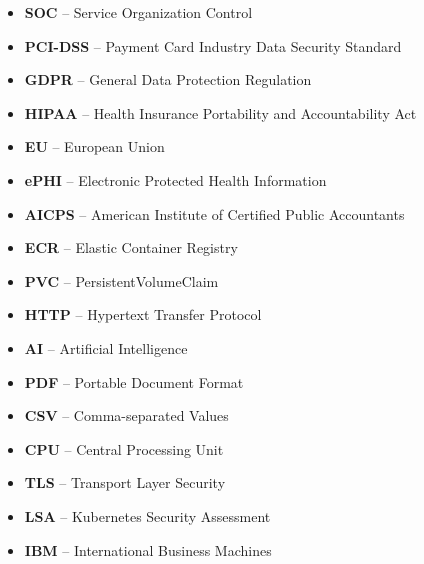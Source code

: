 \begin{itemize}
    \item \textbf{SOC} -- Service Organization Control 
    \item \textbf{PCI-DSS} -- Payment Card Industry Data Security Standard
    \item \textbf{GDPR} -- General Data Protection Regulation
    \item \textbf{HIPAA} -- Health Insurance Portability and Accountability Act
    \item \textbf{EU} -- European Union
    \item \textbf{ePHI} -- Electronic Protected Health Information
    \item \textbf{AICPS} -- American Institute of Certified Public Accountants
    \item \textbf{ECR} -- Elastic Container Registry
    \item \textbf{PVC} -- PersistentVolumeClaim
    \item \textbf{HTTP} -- Hypertext Transfer Protocol
    \item \textbf{AI} -- Artificial Intelligence
    \item \textbf{PDF} -- Portable Document Format
    \item \textbf{CSV} -- Comma-separated Values
    \item \textbf{CPU} -- Central Processing Unit
    \item \textbf{TLS} -- Transport Layer Security
    \item \textbf{LSA} -- Kubernetes Security Assessment
    \item \textbf{IBM} -- International Business Machines
\end{itemize}



